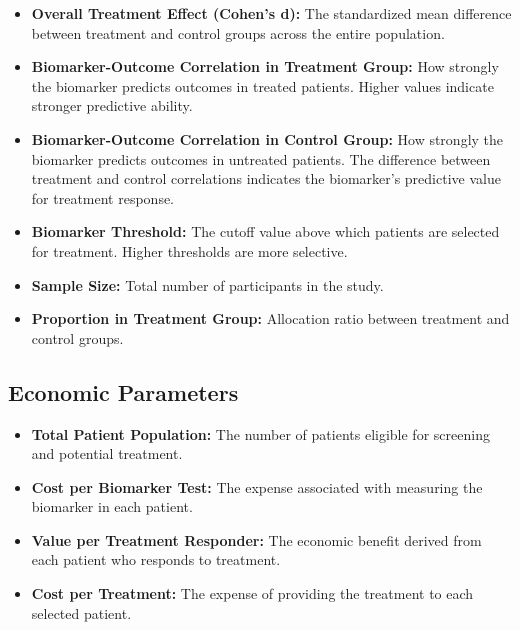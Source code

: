 \documentclass{article}
\begin{document}
\begin{itemize}
    \item \textbf{Overall Treatment Effect (Cohen's d):} The standardized mean difference between treatment and control groups across the entire population.
    
    \item \textbf{Biomarker-Outcome Correlation in Treatment Group:} How strongly the biomarker predicts outcomes in treated patients. Higher values indicate stronger predictive ability.
    
    \item \textbf{Biomarker-Outcome Correlation in Control Group:} How strongly the biomarker predicts outcomes in untreated patients. The difference between treatment and control correlations indicates the biomarker's predictive value for treatment response.
    
    \item \textbf{Biomarker Threshold:} The cutoff value above which patients are selected for treatment. Higher thresholds are more selective.
    
    \item \textbf{Sample Size:} Total number of participants in the study.
    
    \item \textbf{Proportion in Treatment Group:} Allocation ratio between treatment and control groups.
\end{itemize}

\subsection{Economic Parameters}

\begin{itemize}
    \item \textbf{Total Patient Population:} The number of patients eligible for screening and potential treatment.
    
    \item \textbf{Cost per Biomarker Test:} The expense associated with measuring the biomarker in each patient.
    
    \item \textbf{Value per Treatment Responder:} The economic benefit derived from each patient who responds to treatment.
    
    \item \textbf{Cost per Treatment:} The expense of providing the treatment to each selected patient.
\end{itemize}
\end{document}
